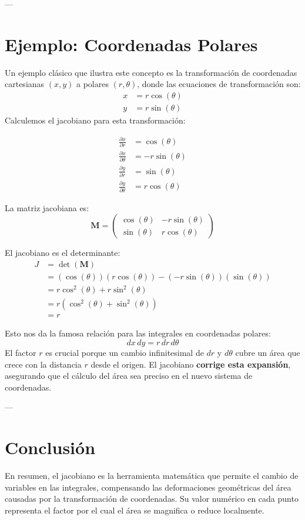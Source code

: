 \documentclass{article}
\begin{document}
---

\section*{Ejemplo: Coordenadas Polares}
Un ejemplo clásico que ilustra este concepto es la transformación de coordenadas cartesianas $(x, y)$ a polares $(r, \theta)$, donde las ecuaciones de transformación son:
\begin{align*}
x &= r \cos(\theta) \\
y &= r \sin(\theta)
\end{align*}
Calculemos el jacobiano para esta transformación:

\begin{align*}
\frac{\partial x}{\partial r} &= \cos(\theta) \\
\frac{\partial x}{\partial \theta} &= -r \sin(\theta) \\
\frac{\partial y}{\partial r} &= \sin(\theta) \\
\frac{\partial y}{\partial \theta} &= r \cos(\theta)
\end{align*}

La matriz jacobiana es:
\[
\mathbf{M} = 
\begin{pmatrix}
\cos(\theta) & -r\sin(\theta) \\
\sin(\theta) & r\cos(\theta)
\end{pmatrix}
\]

El jacobiano es el determinante:
\begin{align*}
J &= \det(\mathbf{M}) \\
&= (\cos(\theta))(r\cos(\theta)) - (-r\sin(\theta))(\sin(\theta)) \\
&= r\cos^2(\theta) + r\sin^2(\theta) \\
&= r(\cos^2(\theta) + \sin^2(\theta)) \\
&= r
\end{align*}

Esto nos da la famosa relación para las integrales en coordenadas polares:
\[
dx\,dy = r\,dr\,d\theta
\]
El factor $r$ es crucial porque un cambio infinitesimal de $dr$ y $d\theta$ cubre un área que crece con la distancia $r$ desde el origen. El jacobiano \textbf{corrige esta expansión}, asegurando que el cálculo del área sea preciso en el nuevo sistema de coordenadas.

---

\section*{Conclusión}
En resumen, el jacobiano es la herramienta matemática que permite el cambio de variables en las integrales, compensando las deformaciones geométricas del área causadas por la transformación de coordenadas. Su valor numérico en cada punto representa el factor por el cual el área se magnifica o reduce localmente.
\end{document}
